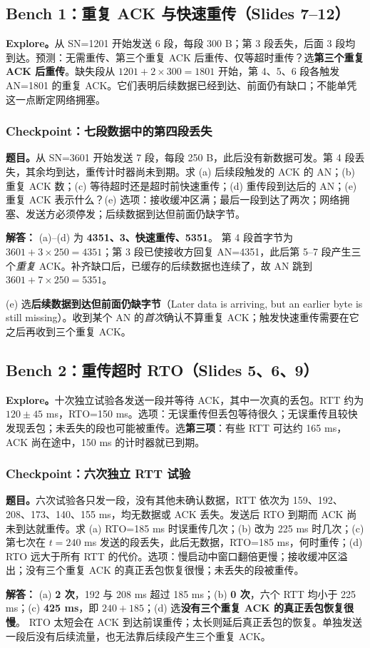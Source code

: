 \documentclass[11pt,a4paper,fontset=fandol]{ctexart}
\renewcommand{\exercisequestion}[2]{%
  \Needspace{5\baselineskip}%
  \subsubsection{#2}\label{exercise:#1}%
}
\renewenvironment{checkedsolution}
  {\par\nopagebreak[4]\textbf{解答：}\ignorespaces}
  {\par}
\begin{document}
\subsection{Bench 1：重复 ACK 与快速重传（Slides 7--12）}

\textbf{Explore。}从 SN=1201 开始发送 6 段，每段 300 B；第 3 段丢失，后面 3 段均到达。预测：无需重传、第三个重复 ACK 后重传、仅等超时重传？选\textbf{第三个重复 ACK 后重传}。缺失段从 $1201+2\times300=1801$ 开始，第 4、5、6 段各触发 AN=1801 的重复 ACK。它们表明后续数据已经到达、前面仍有缺口；不能单凭这一点断定网络拥塞。

\exercisequestion{SC2008-HW05-Q01}{Checkpoint：七段数据中的第四段丢失}
\textbf{题目。}从 SN=3601 开始发送 7 段，每段 250 B，此后没有新数据可发。第 4 段丢失，其余均到达，重传计时器尚未到期。求 (a) 后续段触发的 ACK 的 AN；(b) 重复 ACK 数；(c) 等待超时还是超时前快速重传；(d) 重传段到达后的 AN；(e) 重复 ACK 表示什么？(e) 选项：接收缓冲区满；最后一段到达了两次；网络拥塞、发送方必须停发；后续数据到达但前面仍缺字节。
\begin{checkedsolution}
(a)--(d) 为 \textbf{4351、3、快速重传、5351}。
第 4 段首字节为 $3601+3\times250=4351$；第 3 段已使接收方回复 AN=4351，此后第 5--7 段产生三个\emph{重复} ACK。补齐缺口后，已缓存的后续数据也连续了，故 AN 跳到 $3601+7\times250=5351$。

(e) 选\textbf{后续数据到达但前面仍缺字节}（Later data is arriving, but an earlier byte is still missing）。收到某个 AN 的\emph{首次}确认不算重复 ACK；触发快速重传需要在它之后再收到三个重复 ACK。
\end{checkedsolution}

\subsection{Bench 2：重传超时 RTO（Slides 5、6、9）}

\textbf{Explore。}十次独立试验各发送一段并等待 ACK，其中一次真的丢包。RTT 约为 $120\pm45$ ms，RTO=150 ms。选项：无误重传但丢包等待很久；无误重传且较快发现丢包；未丢失的段也可能被重传。选\textbf{第三项}：有些 RTT 可达约 165 ms，ACK 尚在途中，150 ms 的计时器就已到期。

\exercisequestion{SC2008-HW05-Q02}{Checkpoint：六次独立 RTT 试验}
\textbf{题目。}六次试验各只发一段，没有其他未确认数据，RTT 依次为 159、192、208、173、140、155 ms，均无数据或 ACK 丢失。发送后 RTO 到期而 ACK 尚未到达就重传。求 (a) RTO=185 ms 时误重传几次；(b) 改为 225 ms 时几次；(c) 第七次在 $t=240$ ms 发送的段丢失，此后无数据，RTO=185 ms，何时重传；(d) RTO 远大于所有 RTT 的代价。选项：慢启动中窗口翻倍更慢；接收缓冲区溢出；没有三个重复 ACK 的真正丢包恢复很慢；未丢失的段被重传。
\begin{checkedsolution}
(a) \textbf{2 次}，192 与 208 ms 超过 185 ms；(b) \textbf{0 次}，六个 RTT 均小于 225 ms；(c) \textbf{425 ms}，即 $240+185$；(d) 选\textbf{没有三个重复 ACK 的真正丢包恢复很慢}。
RTO 太短会在 ACK 到达前误重传；太长则延后真正丢包的恢复。单独发送一段后没有后续流量，也无法靠后续段产生三个重复 ACK。
\end{checkedsolution}
\end{document}
